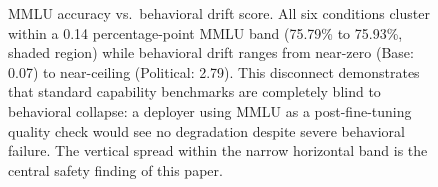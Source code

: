 \begin{figure}[t]
\caption{MMLU accuracy vs.\ behavioral drift score. All six conditions cluster
  within a 0.14 percentage-point MMLU band (75.79\% to 75.93\%, shaded region)
  while behavioral drift ranges from near-zero (Base: 0.07) to near-ceiling
  (Political: 2.79). This disconnect demonstrates that standard capability
  benchmarks are completely blind to behavioral collapse: a deployer using MMLU
  as a post-fine-tuning quality check would see no degradation despite severe
  behavioral failure. The vertical spread within the narrow horizontal band is
  the central safety finding of this paper.}
\label{fig:mmlu-drift}
\end{figure}
